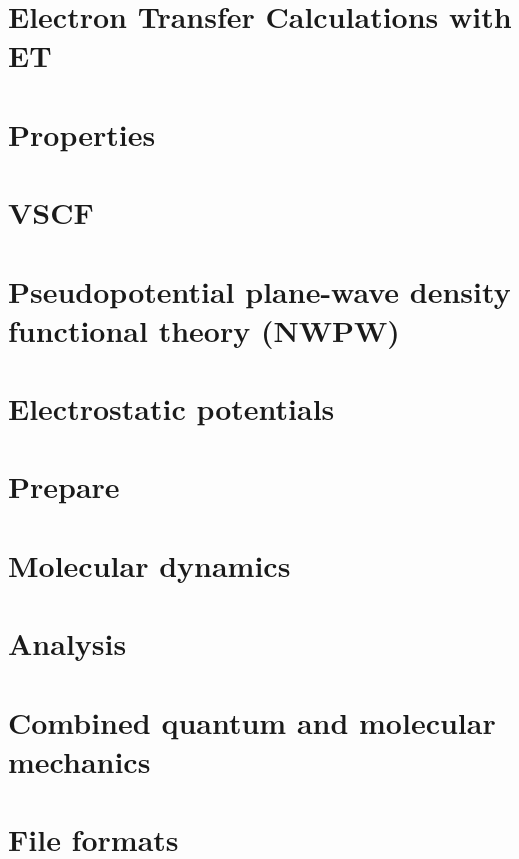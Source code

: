 \chapter{Electron Transfer Calculations with ET}


\chapter{Properties}


\chapter{VSCF}


\chapter{Pseudopotential plane-wave density functional theory (NWPW)}


\chapter{Electrostatic potentials}


\chapter{Prepare}


\chapter{Molecular dynamics}


\chapter{Analysis}


\chapter{Combined quantum and molecular mechanics}


\chapter{File formats}


%

